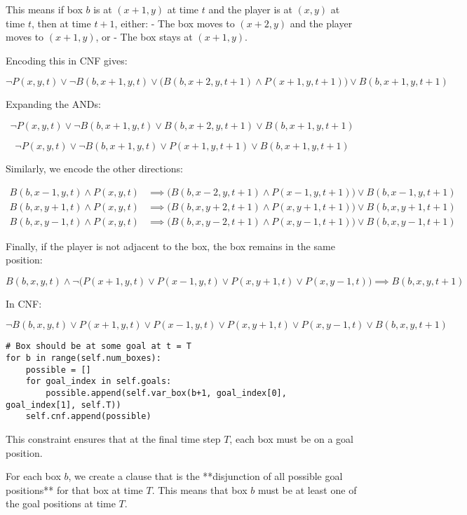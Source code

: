 \documentclass[12pt,a4paper]{article}
\begin{document}
This means if box \(b\) is at \((x+1,y)\) at time \(t\) and the player is at \((x,y)\) at time \(t\), then at time \(t+1\), either:  
- The box moves to \((x+2,y)\) and the player moves to \((x+1,y)\), or  
- The box stays at \((x+1,y)\).

Encoding this in CNF gives:

\[
\neg P(x,y,t) \lor \neg B(b,x+1,y,t) \lor \bigl(B(b,x+2,y,t+1) \wedge P(x+1,y,t+1)\bigr) \vee B(b,x+1,y,t+1)
\]

Expanding the ANDs:

\[
\neg P(x,y,t) \lor \neg B(b,x+1,y,t) \lor B(b,x+2,y,t+1) \vee B(b,x+1,y,t+1)
\]

\[
\neg P(x,y,t) \lor \neg B(b,x+1,y,t) \lor P(x+1,y,t+1) \vee B(b,x+1,y,t+1)
\]

Similarly, we encode the other directions:

\[
\begin{aligned}
B(b,x-1,y,t) \wedge P(x,y,t) &\implies \bigl(B(b,x-2,y,t+1) \wedge P(x-1,y,t+1)\bigr) \vee B(b,x-1,y,t+1) \\
B(b,x,y+1,t) \wedge P(x,y,t) &\implies \bigl(B(b,x,y+2,t+1) \wedge P(x,y+1,t+1)\bigr) \vee B(b,x,y+1,t+1) \\
B(b,x,y-1,t) \wedge P(x,y,t) &\implies \bigl(B(b,x,y-2,t+1) \wedge P(x,y-1,t+1)\bigr) \vee B(b,x,y-1,t+1)
\end{aligned}
\]

Finally, if the player is not adjacent to the box, the box remains in the same position:

\[
B(b,x,y,t) \wedge \neg \bigl(P(x+1,y,t) \vee P(x-1,y,t) \vee P(x,y+1,t) \vee P(x,y-1,t)\bigr) \implies B(b,x,y,t+1)
\]

In CNF:

\[
\neg B(b,x,y,t) \lor P(x+1,y,t) \lor P(x-1,y,t) \lor P(x,y+1,t) \lor P(x,y-1,t) \lor B(b,x,y,t+1)
\]





\begin{lstlisting}
# Box should be at some goal at t = T
for b in range(self.num_boxes):
    possible = []
    for goal_index in self.goals:
        possible.append(self.var_box(b+1, goal_index[0], goal_index[1], self.T))
    self.cnf.append(possible)
\end{lstlisting}

This constraint ensures that at the final time step \(T\), each box must be on a goal position.  

For each box \(b\), we create a clause that is the **disjunction of all possible goal positions** for that box at time \(T\).  
This means that box \(b\) must be at least one of the goal positions at time \(T\).
\end{document}
